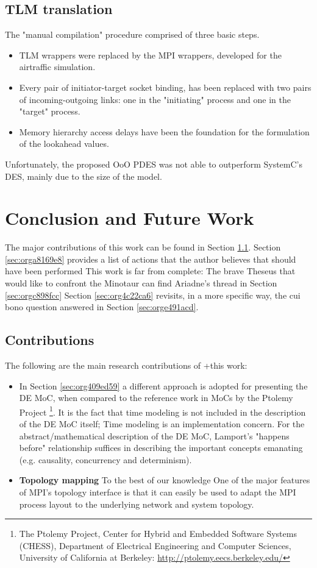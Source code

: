 \documentclass[11pt]{article}
\begin{document}
\subsection{TLM translation}
\label{sec:org8a3fd73}
The "manual compilation" procedure comprised of three basic steps.
\begin{itemize}
\item TLM wrappers were replaced by the MPI wrappers, developed for the airtraffic simulation.
\item Every pair of initiator-target socket binding,  has been replaced with two pairs of incoming-outgoing links: one in the "initiating" process and one in the "target" process.
\item Memory hierarchy access delays have been the foundation for the formulation of the lookahead values.
\end{itemize}
Unfortunately, the proposed OoO PDES was not able to outperform SystemC's DES, mainly due to the size of the model.
\clearpage

\section{Conclusion and Future Work}
\label{sec:orgea628fd}
The major contributions of this work can be found in Section \ref{sec:orge1a9349}.
Section \ref{sec:orga8169e8} provides a list of actions that the author believes that should have been performed
This work is far from complete: The brave Theseus that would like to confront the Minotaur can find Ariadne's thread in Section \ref{sec:orgc898fcc}
Section \ref{sec:org4c22ca6} revisits, in a more specific way, the cui bono question answered in Section \ref{sec:orge491acd}.

\subsection{Contributions}
\label{sec:orge1a9349}
The following are the main research contributions of +this work:
\begin{itemize}
\item In Section \ref{sec:org409ed59} a different approach is adopted for presenting the DE MoC, 
when compared to the reference work in MoCs by the Ptolemy Project \footnote{The Ptolemy Project, Center for Hybrid and Embedded Software Systems (CHESS),
Department of Electrical Engineering and Computer Sciences, University of California at Berkeley: \url{http://ptolemy.eecs.berkeley.edu/}}.
It is the fact that time modeling is not included in the description of the DE MoC itself; 
Time modeling is an implementation concern.
For the abstract/mathematical description of the DE MoC, Lamport's "happens before" relationship \cite{Lamport1978} suffices in describing 
the important concepts emanating (e.g. causality, concurrency and determinism).
\item \textbf{Topology mapping} To the best of our knowledge
One of the major features of MPI's topology interface is that it can easily be used to adapt the MPI process layout to the underlying network and system topology.
\end{itemize}
\end{document}
